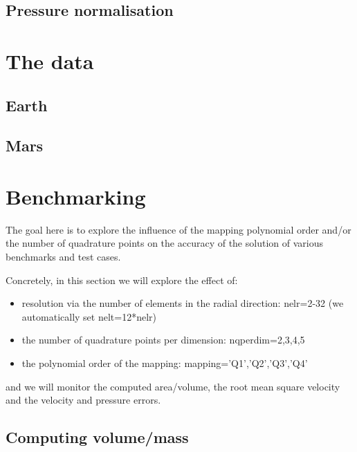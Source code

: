 \documentclass[a4paper,12pt]{article}
\newcommand{\python}{\color{teal} \sffamily }
\begin{document}
\subsection{Pressure normalisation}



\newpage
\section{The data}

\subsection{Earth}


\subsection{Mars}


\newpage
\section{Benchmarking}



The goal here is to explore the influence of the mapping polynomial order and/or
the number of quadrature points on the accuracy of the solution of various benchmarks and test cases.

Concretely, in this section we will explore the effect of:
\begin{itemize}
\item resolution via the number of elements in the radial direction: {\python nelr=2-32} (we automatically set {\python nelt=12*nelr})
\item the number of quadrature points per dimension: {\python nqperdim=2,3,4,5}
\item the polynomial order of the mapping: {\python mapping='Q1','Q2','Q3','Q4'}
\end{itemize}
and we will monitor the computed area/volume, the root mean square velocity and the velocity and pressure errors.

\subsection{Computing volume/mass}

\end{document}
